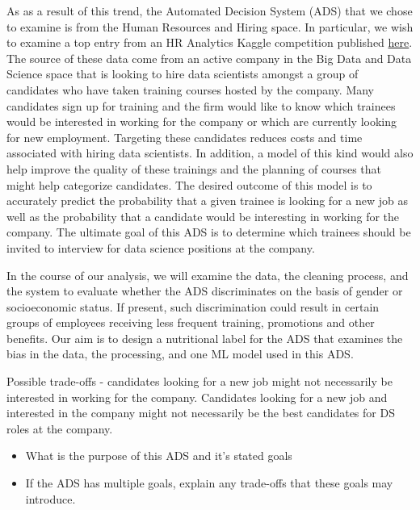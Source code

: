 \documentclass[11pt]{article}
\begin{document}
As as a result of this trend, the Automated Decision System (ADS) that we chose to examine is from the Human Resources and Hiring space.  In particular, we wish to examine a top entry from an HR Analytics Kaggle competition published \href{https://www.kaggle.com/code/joshuaswords/awesome-hr-data-visualization-prediction/notebook}{here}.  The source of these data come from an active company in the Big Data and Data Science space that is looking to hire data scientists amongst a group of candidates who have taken training courses hosted by the company.  Many candidates sign up for training and the firm would like to know which trainees would be interested in working for the company or which are currently looking for new employment.  Targeting these candidates reduces costs and time associated with hiring data scientists.  In addition, a model of this kind would also help improve the quality of these trainings and the planning of courses that might help categorize candidates.  The desired outcome of this model is to accurately predict the probability that a given trainee is looking for a new job as well as the probability that a candidate would be interesting in working for the company.  The ultimate goal of this ADS is to determine which trainees should be invited to interview for data science positions at the company.


In the course of our analysis, we will examine the data, the cleaning process, and the system to evaluate whether the ADS discriminates on the basis of gender or socioeconomic status. If present, such discrimination could result in certain groups of  employees receiving less frequent training, promotions and other benefits. Our aim is to design a nutritional label for the ADS that examines the bias in the data, the processing, and one ML model used in this ADS. 

Possible trade-offs - candidates looking for a new job might not necessarily be interested in working for the company.  Candidates looking for a new job and interested in the company might not necessarily be the best candidates for DS roles at the company.

\begin{itemize}
\item What is the purpose of this ADS and it's stated goals
\item If the ADS has multiple goals, explain any trade-offs that these goals may introduce.
\end{itemize}


\pagebreak
\end{document}
